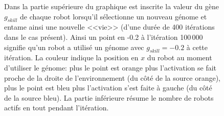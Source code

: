 \documentclass[a4paper,10pt]{report}
\begin{document}
\begin{figure}[H]
{		\label{fig:evol:2S1to1S1}	
	}
	\hspace{\myspace}
	\caption[Différents cas de figures]{Dans la partie supérieure du graphique est inscrite la valeur du gène $g_{skill}$ de chaque robot lorsqu'il sélectionne un nouveau génome et entame ainsi une nouvelle <<vie>> (d'une durée de 400 itérations dans le cas présent). Ainsi un point en -0.2 à l'itération 100\,000 signifie qu'un robot a utilisé un génome avec $g_{skill}=-0.2$ à cette itération. La couleur indique la position en $x$ du robot au moment d'utiliser le génome: plus le point est orange plus l'activation se fait proche de la droite de l'environnement (du côté de la source orange), plus le point est bleu plus l'activation s'est faite à gauche (du côté de la source bleu). La partie inférieure résume le nombre de robots actifs en tout pendant l'itération. }
	\label{fig:evol}
	\end{figure}
	
\end{document}
